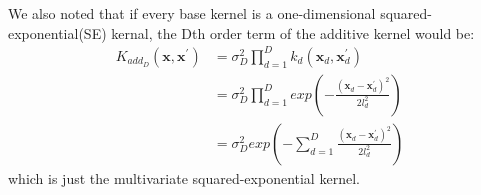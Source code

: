 We also noted that if every base kernel is a one-dimensional squared-exponential(SE) kernal, the Dth order term of the additive kernel would be:
\begin{equation} \label{eqa:add}
\begin{aligned}
K_{add_{D}} (\textbf{x},\textbf{x}^{'}) &= \sigma_{D}^{2} \prod_{d=1}^D k_{d} (\textbf{x}_{d},\textbf{x}_{d}^{'}) \\
		     &= \sigma_{D}^{2} \prod_{d=1}^D exp(-\frac{(\textbf{x}_{d}-\textbf{x}_{d}^{'})^{2}}{2l_{d}^{2}}) \\
		     &= \sigma_{D}^{2}  exp(-\sum_{d=1}^{D} \frac{(\textbf{x}_{d}-\textbf{x}_{d}^{'})^{2}}{2l_{d}^{2}})
\end{aligned}
\end{equation}
which is just the multivariate squared-exponential kernel.















